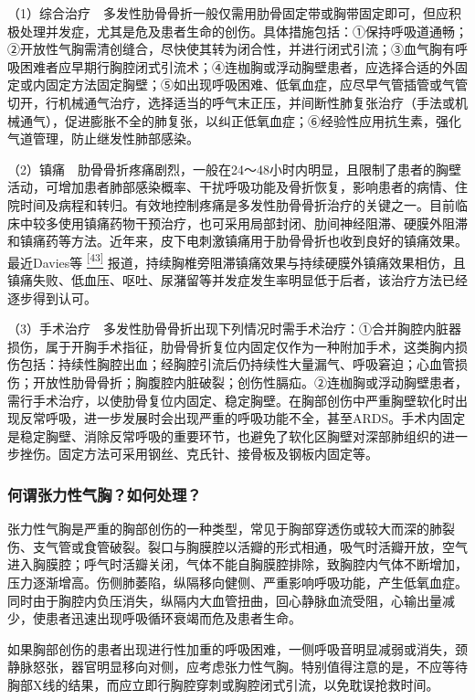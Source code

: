 （1）综合治疗　多发性肋骨骨折一般仅需用肋骨固定带或胸带固定即可，但应积极处理并发症，尤其是危及患者生命的创伤。具体措施包括：①保持呼吸道通畅；②开放性气胸需清创缝合，尽快使其转为闭合性，并进行闭式引流；③血气胸有呼吸困难者应早期行胸腔闭式引流术；④连枷胸或浮动胸壁患者，应选择合适的外固定或内固定方法固定胸壁；⑤如出现呼吸困难、低氧血症，应尽早气管插管或气管切开，行机械通气治疗，选择适当的呼气末正压，并间断性肺复张治疗（手法或机械通气），促进膨胀不全的肺复张，以纠正低氧血症；⑥经验性应用抗生素，强化气道管理，防止继发性肺部感染。

（2）镇痛　肋骨骨折疼痛剧烈，一般在24～48小时内明显，且限制了患者的胸壁活动，可增加患者肺部感染概率、干扰呼吸功能及骨折恢复，影响患者的病情、住院时间及病程和转归。有效地控制疼痛是多发性肋骨骨折治疗的关键之一。目前临床中较多使用镇痛药物干预治疗，也可采用局部封闭、肋间神经阻滞、硬膜外阻滞和镇痛药等方法。近年来，皮下电刺激镇痛用于肋骨骨折也收到良好的镇痛效果。最近Davies等
\protect\hyperlink{text00024.htmlux5cux23ch43-23}{\textsuperscript{{[}43{]}}}
报道，持续胸椎旁阻滞镇痛效果与持续硬膜外镇痛效果相仿，且镇痛失败、低血压、呕吐、尿潴留等并发症发生率明显低于后者，该治疗方法已经逐步得到认可。

（3）手术治疗　多发性肋骨骨折出现下列情况时需手术治疗：①合并胸腔内脏器损伤，属于开胸手术指征，肋骨骨折复位内固定仅作为一种附加手术，这类胸内损伤包括：持续性胸腔出血；经胸腔引流后仍持续性大量漏气、呼吸窘迫；心血管损伤；开放性肋骨骨折；胸腹腔内脏破裂；创伤性膈疝。②连枷胸或浮动胸壁患者，需行手术治疗，以使肋骨复位内固定、稳定胸壁。在胸部创伤中严重胸壁软化时出现反常呼吸，进一步发展时会出现严重的呼吸功能不全，甚至ARDS。手术内固定是稳定胸壁、消除反常呼吸的重要环节，也避免了软化区胸壁对深部肺组织的进一步挫伤。固定方法可采用钢丝、克氏针、接骨板及钢板内固定等。

\subsubsection{何谓张力性气胸？如何处理？}

张力性气胸是严重的胸部创伤的一种类型，常见于胸部穿透伤或较大而深的肺裂伤、支气管或食管破裂。裂口与胸膜腔以活瓣的形式相通，吸气时活瓣开放，空气进入胸膜腔；呼气时活瓣关闭，气体不能自胸膜腔排除，致胸腔内气体不断增加，压力逐渐增高。伤侧肺萎陷，纵隔移向健侧、严重影响呼吸功能，产生低氧血症。同时由于胸腔内负压消失，纵隔内大血管扭曲，回心静脉血流受阻，心输出量减少，使患者迅速出现呼吸循环衰竭而危及患者生命。

如果胸部创伤的患者出现进行性加重的呼吸困难，一侧呼吸音明显减弱或消失，颈静脉怒张，器官明显移向对侧，应考虑张力性气胸。特别值得注意的是，不应等待胸部X线的结果，而应立即行胸腔穿刺或胸腔闭式引流，以免耽误抢救时间。


